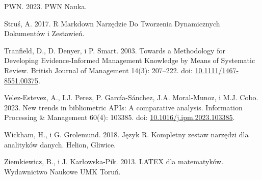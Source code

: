 \documentclass[
  12pt,
]{article}
\newlength{\cslhangindent}
\newlength{\cslentryspacingunit} %
\newenvironment{CSLReferences}[2] %
 {%
  \setlength{\parindent}{0pt}
  \ifodd #1
  \let\oldpar\par
  \def\par{\hangindent=\cslhangindent\oldpar}
  \fi
  \setlength{\parskip}{#2\cslentryspacingunit}
 }%
 {}
\begin{document}
\begin{CSLReferences}{1}{0}
\leavevmode{}%
PWN. 2023. PWN Nauka.

\leavevmode{}%
Struś, A. 2017. R {Markdown} Narzędzie Do Tworzenia Dynamicznych
Dokumentów i Zestawień.

\leavevmode{}%
Tranfield, D., D. Denyer, i P. Smart. 2003. Towards a Methodology for
Developing Evidence-Informed Management Knowledge by Means of Systematic
Review. British Journal of Management 14(3): 207--222. doi:
\href{https://doi.org/10.1111/1467-8551.00375}{10.1111/1467-8551.00375}.

\leavevmode{}%
Velez-Estevez, A., I.J. Perez, P. García-Sánchez, J.A. Moral-Munoz, i
M.J. Cobo. 2023. New trends in bibliometric APIs: A comparative
analysis. Information Processing \& Management 60(4): 103385. doi:
\href{https://doi.org/10.1016/j.ipm.2023.103385}{10.1016/j.ipm.2023.103385}.

\leavevmode{}%
Wickham, H., i G. Grolemund. 2018. J{ę}zyk R. Kompletny zestaw
narz{ę}dzi dla analityków danych. Helion, Gliwice.

\leavevmode{}%
Ziemkiewicz, B., i J. Karłowska-Pik. 2013. LATEX dla matematyków.
Wydawnictwo Naukowe UMK Toru{ń}.

\end{CSLReferences}
\end{document}
